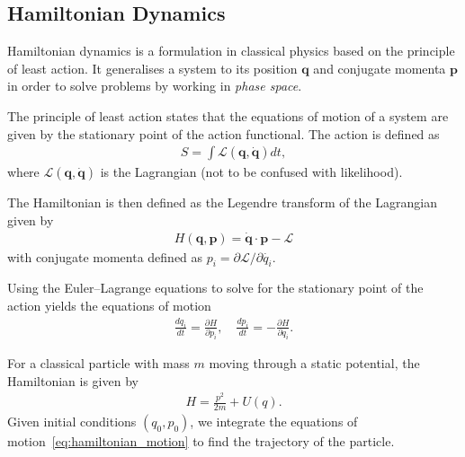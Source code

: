 \documentclass[11pt]{article}
\begin{document}
\subsection{Hamiltonian Dynamics}\label{subsec:hamiltonian_dynamics}
    Hamiltonian dynamics is a formulation in classical physics based on the principle of least action.
    It generalises a system to its position $\mathbf{q}$ and conjugate momenta $\mathbf{p}$ in order to solve problems
    by working in \emph{phase space}.

    The principle of least action states that the equations of motion of a system are given by the stationary point of
    the action functional.
    The action is defined as
    \begin{equation}\label{eq:action_definition}
    \begin{aligned}
        S = \int  \mathcal{L}(\mathbf{q}, \mathbf{\dot{q}}) dt,
    \end{aligned}
    \end{equation}
    where $\mathcal{L}(\mathbf{q}, \mathbf{\dot{q}})$ is the Lagrangian (not to be confused with likelihood).

    The Hamiltonian is then defined as the Legendre transform of the Lagrangian given by
    \begin{equation}\label{eq:hamiltonian_definition}
    \begin{aligned}
        H(\mathbf{q}, \mathbf{p}) = \mathbf{\dot{q}} \cdot \mathbf{p} - \mathcal{L}
    \end{aligned}
    \end{equation}
    with conjugate momenta defined as $p_i = \partial \mathcal{L} / \partial \dot{q_i}$.

    Using the Euler--Lagrange equations to solve for the stationary point of the action yields the equations of motion
    \begin{equation}\label{eq:hamiltonian_motion}
    \begin{aligned}
        \frac{dq_i}{dt} = \frac{\partial H}{\partial p_i}, \quad \frac{dp_i}{dt} = -\frac{\partial H}{\partial q_i}.
    \end{aligned}
    \end{equation}

    For a classical particle with mass $m$ moving through a static potential, the Hamiltonian is given by
    \begin{equation}\label{eq:classic_hamiltonian}
    \begin{aligned}
        H = \frac{p^2}{2m} + U(q).
    \end{aligned}
    \end{equation}
    Given initial conditions $(q_0, p_0)$, we integrate the equations of motion~\eqref{eq:hamiltonian_motion} to find
    the trajectory of the particle.
\end{document}
